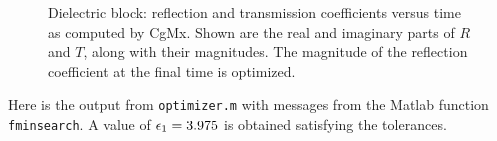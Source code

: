 \documentclass[11pt]{article}
\begin{document}

{%
%
\newcommand{\figWidth}{7.8cm}%
\newcommand{\trimfig}[2]{\trimw{#1}{#2}{.0}{.0}{.0}{.0}}
\begin{figure}[htb]
\begin{center}
\end{center}
\caption{Dielectric block: reflection and transmission coefficients versus time as computed by CgMx.
Shown are the real and imaginary parts of $R$ and $T$, along with their magnitudes. 
   The magnitude of the
  reflection coefficient
  at the final time is optimized. 
}
  \label{fig:dielectrciBlockRT}
\end{figure}
}



\noindent Here is the output from {\tt optimizer.m} with messages from the Matlab function {\tt fminsearch}.  A value
of $\epsilon_1=3.975$ is obtained satisfying the tolerances. 
\end{document}
